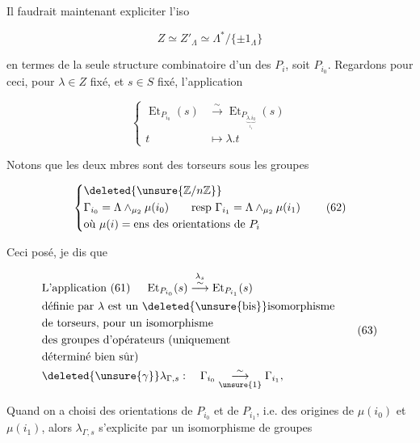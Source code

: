 Il faudrait maintenant expliciter l'iso

\[
Z\simeq Z'_\Lambda\simeq\Lambda^*/\{\pm 1_\Lambda\}\tag*{(60)}
\]

en termes de la seule structure combinatoire d'un des $P_i$, soit $P_{i_0}$. Regardons pour ceci, pour $\lambda\in Z$ fixé, et $s\in S$ fixé, l'application

\[
\left\{\begin{aligned}
 \operatorname{Et}_{P_{i_0}}(s)&\overset{\sim}{\longrightarrow}\operatorname{Et}_{P_{\underbrace{\lambda.i_0}_{i_1}}}(s)\\
 t&\longmapsto\lambda.t
\end{aligned}\right.\tag*{(61)}
\]

Notons que les deux mbres sont des torseurs sous les groupes

\[
\left\{\begin{aligned}
 &\deleted{\unsure{\mathbb Z/n\mathbb Z}}\\
 &\Gamma_{i_0}=\Lambda\wedge_{\mu_2}\mu(i_0)\qquad\text{resp }\Gamma_{i_1}=\Lambda\wedge_{\mu_2}\mu(i_1)\\
 &\text{où }\mu(i)=\text{ens des orientations de }P_i
\end{aligned}\right.\tag*{(62)}
\]

Ceci posé, je dis que

\[
\begin{aligned}
 &\text{L'application (61) }\quad\operatorname{Et}_{P_{i_0}}(s)\overset{\lambda_s}{\overset{\sim}{\longrightarrow}}\operatorname{Et}_{P_{i_1}}(s)\\
 &\text{définie par }\lambda\text{ est un }\deleted{\text{\unsure{bis}}}\text{isomorphisme}\\
 &\text{de torseurs, pour un isomorphisme}\\
 &\text{des groupes d'opérateurs (uniquement}\\
 &\text{déterminé bien sûr)}\\
 &\deleted{\unsure{\gamma}}\lambda_{\Gamma,s}:\quad\Gamma_{i_0}\overset{\sim}{\underset{\unsure{1}}{\longrightarrow}}\Gamma_{i_1},
\end{aligned}\tag*{(63)}
\]


Quand on a choisi des orientations de $P_{i_0}$ et de $P_{i_1}$, i.e. des origines de $\mu(i_0)$ et $\mu(i_1)$, alors $\lambda_{\Gamma,s}$ s'explicite par un isomorphisme de groupes

